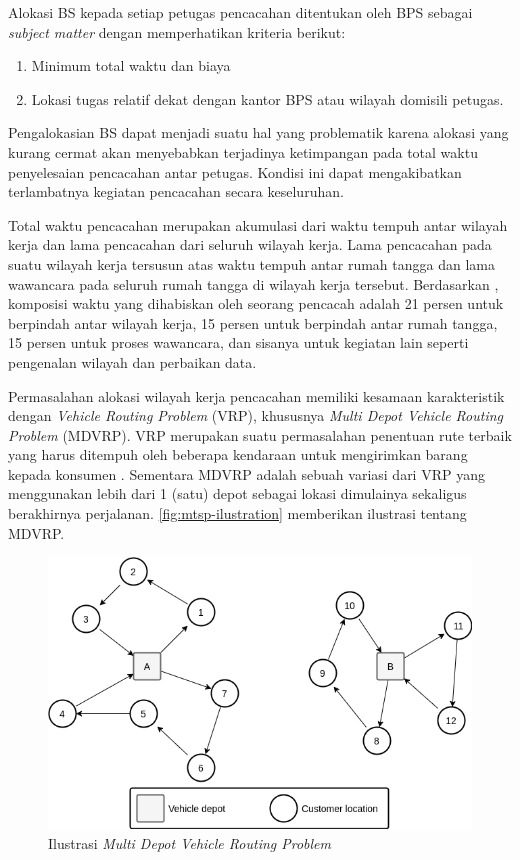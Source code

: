 Alokasi BS kepada setiap petugas pencacahan ditentukan oleh BPS sebagai \textit{subject matter} dengan memperhatikan kriteria berikut:
\begin{enumerate}
	\item Minimum total waktu dan biaya 
	\item Lokasi tugas relatif dekat dengan kantor BPS atau wilayah domisili petugas. 
\end{enumerate}
Pengalokasian BS dapat menjadi suatu hal yang problematik karena alokasi yang kurang cermat akan menyebabkan terjadinya ketimpangan pada total waktu penyelesaian pencacahan antar petugas. Kondisi ini dapat mengakibatkan terlambatnya kegiatan pencacahan secara keseluruhan.


Total waktu pencacahan merupakan akumulasi dari waktu tempuh antar wilayah kerja dan lama pencacahan dari seluruh wilayah kerja. Lama pencacahan pada suatu wilayah kerja  tersusun atas waktu tempuh antar rumah tangga dan lama wawancara pada seluruh rumah tangga di wilayah kerja tersebut. Berdasarkan \citep{sudman_time_1965}, komposisi waktu yang dihabiskan oleh seorang pencacah adalah 21 persen untuk berpindah antar wilayah kerja, 15 persen untuk berpindah antar rumah tangga, 15 persen untuk proses wawancara, dan sisanya untuk kegiatan lain seperti pengenalan wilayah dan perbaikan data.


Permasalahan alokasi wilayah kerja pencacahan memiliki kesamaan karakteristik dengan \textit{Vehicle Routing Problem} (VRP), khususnya \textit{Multi Depot Vehicle Routing Problem} (MDVRP). VRP merupakan suatu permasalahan penentuan rute terbaik yang harus ditempuh oleh beberapa kendaraan untuk mengirimkan barang kepada konsumen \citep{dantzig_truck_1959}. Sementara MDVRP adalah sebuah variasi dari VRP yang menggunakan lebih dari 1 (satu) depot sebagai lokasi dimulainya sekaligus berakhirnya perjalanan. \autoref{fig:mtsp-ilustration} memberikan ilustrasi tentang MDVRP. 


\begin{figure}[!]
    \centering
    \includegraphics[width=12cm]{Resources/Images/mdvrp-illustration}
    \captionsetup{format=hang}
    \caption{Ilustrasi \textit{Multi Depot Vehicle Routing Problem}}
    \label{fig:mtsp-ilustration}
\end{figure}


